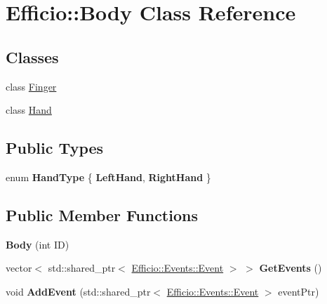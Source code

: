 \hypertarget{class_efficio_1_1_body}{}\section{Efficio\+:\+:Body Class Reference}
\label{class_efficio_1_1_body}
\subsection*{Classes}
\begin{DoxyCompactItemize}
\item 
class \hyperlink{class_efficio_1_1_body_1_1_finger}{Finger}
\item 
class \hyperlink{class_efficio_1_1_body_1_1_hand}{Hand}
\end{DoxyCompactItemize}
\subsection*{Public Types}
\begin{DoxyCompactItemize}
\item 
enum {\bfseries Hand\+Type} \{ {\bfseries Left\+Hand}, 
{\bfseries Right\+Hand}
 \}\hypertarget{class_efficio_1_1_body_a205e9fd8ff578f62c2aac4c654d60d11}{}\label{class_efficio_1_1_body_a205e9fd8ff578f62c2aac4c654d60d11}

\end{DoxyCompactItemize}
\subsection*{Public Member Functions}
\begin{DoxyCompactItemize}
\item 
{\bfseries Body} (int ID)\hypertarget{class_efficio_1_1_body_a9590bede3bfa02bb53878cd3dcf9143e}{}\label{class_efficio_1_1_body_a9590bede3bfa02bb53878cd3dcf9143e}

\item 
vector$<$ std\+::shared\+\_\+ptr$<$ \hyperlink{class_efficio_1_1_events_1_1_event}{Efficio\+::\+Events\+::\+Event} $>$ $>$ {\bfseries Get\+Events} ()\hypertarget{class_efficio_1_1_body_a4fc4cd582563185ea556809253ed4992}{}\label{class_efficio_1_1_body_a4fc4cd582563185ea556809253ed4992}

\item 
void {\bfseries Add\+Event} (std\+::shared\+\_\+ptr$<$ \hyperlink{class_efficio_1_1_events_1_1_event}{Efficio\+::\+Events\+::\+Event} $>$ event\+Ptr)\hypertarget{class_efficio_1_1_body_aeacb5c899f96598b123a433c36c913f2}{}\label{class_efficio_1_1_body_aeacb5c899f96598b123a433c36c913f2}

\end{DoxyCompactItemize}

